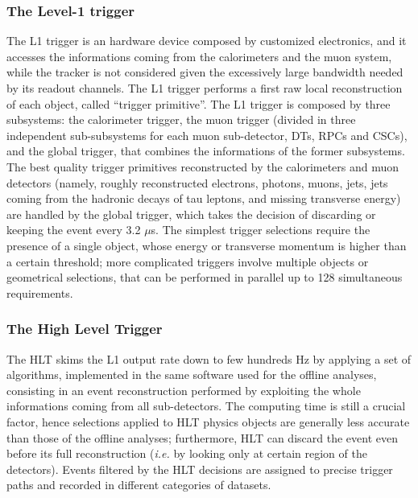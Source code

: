 \subsubsection{The Level-1 trigger}
The L1 trigger is an hardware device composed by customized electronics, and it accesses the informations coming from the calorimeters and the muon system, while the tracker is not considered given the excessively large bandwidth needed by its readout channels. The L1 trigger performs a first raw local reconstruction of each object, called ``trigger primitive''. The L1 trigger is composed by three subsystems: the calorimeter trigger, the muon trigger (divided in three independent sub-subsystems for each muon sub-detector, DTs, RPCs and CSCs), and the global trigger, that combines the informations of the former subsystems. The best quality trigger primitives reconstructed by the calorimeters and muon detectors (namely, roughly reconstructed electrons, photons, muons, jets, jets coming from the hadronic decays of tau leptons, and missing transverse energy) are handled by the global trigger, which takes the decision of discarding or keeping the event every 3.2 $\mu$s. The simplest trigger selections require the presence of a single object, whose energy or transverse momentum is higher than a certain threshold; more complicated triggers involve multiple objects or geometrical selections, that can be performed in parallel up to 128 simultaneous requirements.

\subsubsection{The High Level Trigger}
The HLT skims the L1 output rate down to few hundreds Hz by applying a set of algorithms, implemented in the same software used for the offline analyses, consisting in an event reconstruction performed by exploiting the whole informations coming from all sub-detectors. The computing time is still a crucial factor, hence selections applied to HLT physics objects are generally less accurate than those of the offline analyses; furthermore, HLT can discard the event even before its full reconstruction (\textit{i.e.} by looking only at certain region of the detectors). Events filtered by the HLT decisions are assigned to precise trigger paths and recorded in different categories of datasets.

